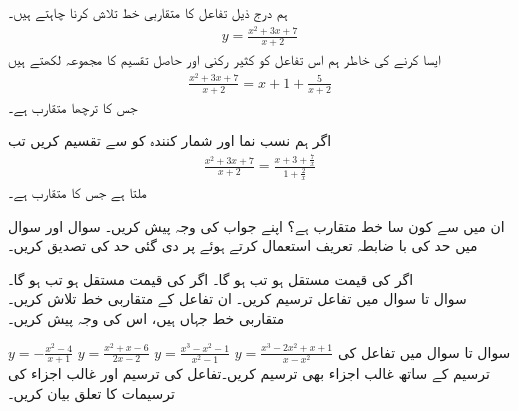 ہم درج ذیل تفاعل کا متقاربی خط تلاش کرنا چاہتے ہیں۔
\begin{align*}
y=\frac{x^2+3x+7}{x+2}
\end{align*}
ایسا کرنے کی خاطر ہم اس تفاعل کو کثیر رکنی اور حاصل تقسیم کا مجموعہ لکھتے ہیں
\begin{align*}
\frac{x^2+3x+7}{x+2}=x+1+\frac{5}{x+2}
\end{align*}
جس کا ترچھا متقارب  ہے۔

اگر ہم نسب نما اور شمار کنندہ کو  سے تقسیم کریں تب
\begin{align*}
\frac{x^2+3x+7}{x+2}=\frac{x+3+\tfrac{7}{x}}{1+\tfrac{2}{x}}
\end{align*} 
ملتا ہے جس کا  متقارب  ہے۔

ان میں سے کون سا خط متقارب ہے؟ اپنے جواب کی وجہ پیش کریں۔
سوال  اور سوال  میں حد کی با ضابطہ تعریف استعمال کرتے ہوئے  پر دی گئی حد کی تصدیق کریں۔

اگر  کی قیمت مستقل ہو  تب  ہو گا۔
اگر  کی قیمت مستقل ہو  تب  ہو گا۔
\\
سوال  تا سوال  میں تفاعل ترسیم کریں۔ ان تفاعل کے متقاربی خط تلاش کریں۔ متقاربی خط جہاں ہیں، اس کی وجہ پیش کریں۔

$y=-\tfrac{x^2-4}{x+1}$
$y=\tfrac{x^2+x-6}{2x-2}$
$y=\tfrac{x^3-x^2-1}{x^2-1}$
$y=\tfrac{x^3-2x^2+x+1}{x-x^2}$
سوال  تا سوال  میں تفاعل کی ترسیم کے ساتھ غالب اجزاء بھی ترسیم کریں۔تفاعل کی ترسیم اور غالب اجزاء کی ترسیمات کا تعلق بیان کریں۔

